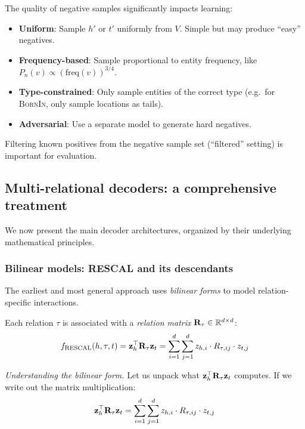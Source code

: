 \begin{notechapter}
\begin{remark}
The quality of negative samples significantly impacts learning:
\begin{itemize}
    \item \textbf{Uniform}: Sample $h'$ or $t'$ uniformly from $V$. Simple but may produce ``easy'' negatives.
    \item \textbf{Frequency-based}: Sample proportional to entity frequency, like $P_n(v) \propto (\text{freq}(v))^{3/4}$.
    \item \textbf{Type-constrained}: Only sample entities of the correct type (e.g.\ for \textsc{BornIn}, only sample locations as tails).
    \item \textbf{Adversarial}: Use a separate model to generate hard negatives.
\end{itemize}
Filtering known positives from the negative sample set (``filtered'' setting) is important for evaluation.
\end{remark}


\subsection{Multi-relational decoders: a comprehensive treatment}

We now present the main decoder architectures, organized by their underlying mathematical principles.

\subsubsection{Bilinear models: RESCAL and its descendants}

The earliest and most general approach uses \emph{bilinear forms} to model relation-specific interactions.

\begin{definition}
Each relation $\tau$ is associated with a \emph{relation matrix} $\mathbf{R}_\tau \in \mathbb{R}^{d \times d}$:
\begin{equation}
f_{\text{RESCAL}}(h, \tau, t) = \mathbf{z}_h^\top \mathbf{R}_\tau \mathbf{z}_t = \sum_{i=1}^{d} \sum_{j=1}^{d} z_{h,i} \cdot R_{\tau,ij} \cdot z_{t,j}
\end{equation}
\end{definition}

\begin{intuition}
\emph{Understanding the bilinear form.}
Let us unpack what $\mathbf{z}_h^\top \mathbf{R}_\tau \mathbf{z}_t$ computes. If we write out the matrix multiplication:
\[
\mathbf{z}_h^\top \mathbf{R}_\tau \mathbf{z}_t = \sum_{i=1}^{d} \sum_{j=1}^{d} z_{h,i} \cdot R_{\tau,ij} \cdot z_{t,j}
\]


\end{intuition}
\end{notechapter}

